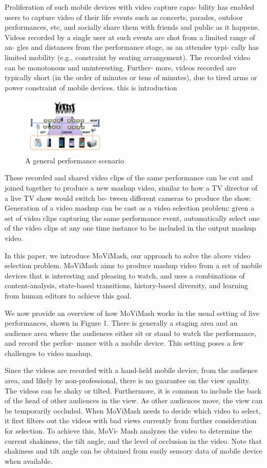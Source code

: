 \documentclass{sig-alternate}
\begin{document}
Proliferation of such mobile devices with video capture capa-
bility has enabled users to capture video of their life events such
as concerts, parades, outdoor performances, etc, and socially share
them with friends and public as it happens. Videos recorded by
a single user at such events are shot from a limited range of an-
gles and distances from the performance stage, as an attendee typi-
cally has limited mobility (e.g., constraint by seating arrangement).
The recorded video can be monotonous and uninteresting. Further-
more, videos recorded are typically short (in the order of minutes
or tens of minutes), due to tired arms or power constraint of mobile
devices. this is introduction

\begin{figure}[htp]
\centering
\includegraphics[width=4cm]{images/img1.png}
\caption{A general performance scenario}
\end{figure}


These recorded and shared video clips of the same performance
can be cut and joined together to produce a new mashup video,
similar to how a TV director of a live TV show would switch be-
tween different cameras to produce the show. Generation of a video
mashup can be cast as a video selection problem: given a set of
video clips capturing the same performance event, automatically
select one of the video clips at any one time instance to be included
in the output mashup video.

In this paper, we introduce MoViMash, our approach to solve
the above video selection problem. MoViMash aims to produce
mashup video from a set of mobile devices that is interesting and
pleasing to watch, and uses a combinations of content-analysis,
state-based transitions, history-based diversity, and learning from
human editors to achieve this goal.

We now provide an overview of how MoViMash works in the
usual setting of live performances, shown in Figure 1. There is
generally a staging area and an audience area where the audiences
either sit or stand to watch the performance, and record the perfor-
mance with a mobile device. This setting poses a few challenges to
video mashup.

Since the videos are recorded with a hand-held mobile device,
from the audience area, and likely by non-professional, there is no
guarantee on the view quality. The videos can be shaky or tilted.
Furthermore, it is common to include the back of the head of other
audiences in the view. As other audiences move, the view can be
temporarily occluded. When MoViMash needs to decide which
video to select, it first filters out the videos with bad views currently
from further consideration for selection. To achieve this, MoVi-
Mash analyzes the video to determine the current shakiness, the tilt
angle, and the level of occlusion in the video. Note that shakiness and tilt angle can be obtained from easily sensory data of mobile
device when available.
\end{document}
